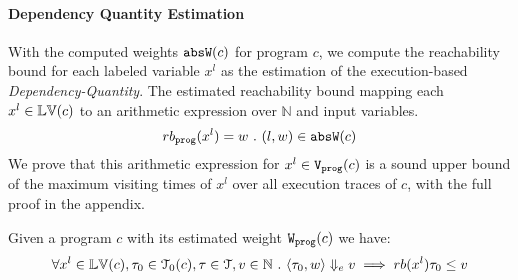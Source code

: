 \paragraph{Dependency Quantity Estimation}
%
%
With the computed weights $\mathtt{abs}{\mathtt{W}}(c)$ for program $c$,
we compute the reachability bound for each labeled variable $x^l$ as the estimation of the 
execution-based \emph{Dependency-Quantity}. 
The estimated reachability bound mapping each $x^l \in \mathbb{LV}(c)$ to an arithmetic expression over $\mathbb{N}$ and
input variables. 
\[ 
 rb_{\mathtt{prog}}(x^l) = w ~.~ (l, w) \in \mathtt{abs}{\mathtt{W}}(c)
 \]
%
We prove that this 
arithmetic expression for $x^l \in \mathtt{{V_{prog}}}(c)$ is a sound upper bound of 
the maximum visiting times of $x^l$ over all execution traces of $c$, with the full proof in the appendix.
 \begin{thm}
 \label{thm:addweight_soundness}
 Given a program ${c}$ with its estimated weight $\mathtt{{W_{prog}}}(c)$
 we have:
 \[
 \forall x^l \in \mathbb{LV}(c), \mathtt{\tau}_0 \in \mathcal{T}_0(c), \mathtt{\tau} \in \mathcal{T},
 v \in \mathbb{N}
 ~.~ 
 \langle \mathtt{\tau}_0, w \rangle \Downarrow_e v
 \implies
 rb(x^l) \mathtt{\tau}_0 \leq v
 \]
 \end{thm}
%
